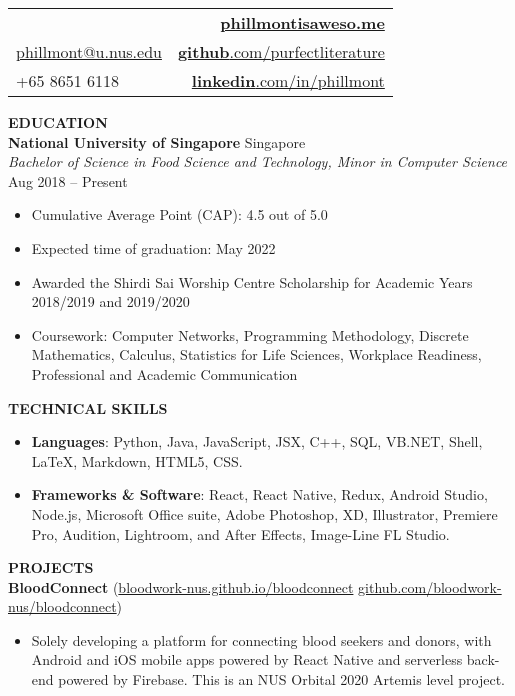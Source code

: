 \documentclass[a4paper, 11pt]{article}
\makeatletter
\newcommand{\interspace}{\vspace{7pt}}
\newcommand{\name}{Phillmont Muktar}
\newcommand{\cname}{\begin{CJK*}{UTF8}{zhsong}郑传期\end{CJK*}}
\newcommand{\tel}{+65 8651 6118}
\newcommand{\email}{\href{mailto:phillmont@u.nus.edu}{phillmont@u.nus.edu}}
\newcommand{\linkedin}{\href{http://linkedin.com/in/phillmont}{\textbf{linkedin}.com/in/phillmont}}
\newcommand{\github}{\href{http://github.com/purfectliterature}{\textbf{github}.com/purfectliterature}}
\newcommand{\mysite}{\href{https://phillmontisaweso.me}{\textbf{phillmontisaweso.me}}}
\makeatother
\begin{document}
	\sffamily
	
	\begin{tabularx}{\linewidth}{@{}X r@{}}
		{\Large \textbf{\name, \cname}} & \mysite\\ 
		\email & \github\\
		\tel & \linkedin
	\end{tabularx}

	\interspace

	\textbf{\large EDUCATION} \hrulefill \\
	\textbf{National University of Singapore} \hfill Singapore\\
	\textit{Bachelor of Science in Food Science and Technology, Minor in Computer Science} \hfill Aug 2018 -- Present
	\begin{itemize}[leftmargin=*, noitemsep, topsep=0pt]
		\item Cumulative Average Point (CAP): 4.5 out of 5.0
		\item Expected time of graduation: May 2022
		\item Awarded the Shirdi Sai Worship Centre Scholarship for Academic Years 2018/2019 and 2019/2020
		\item Coursework: Computer Networks, Programming Methodology, Discrete Mathematics, Calculus, Statistics for Life Sciences, Workplace Readiness, Professional and Academic Communication
	\end{itemize}
	
	\interspace
	
	\textbf{\large TECHNICAL SKILLS} \hrulefill
	\begin{itemize}[leftmargin=*, noitemsep, topsep=0pt]
		\item \textbf{Languages}: Python, Java, JavaScript, JSX, C++, SQL, VB.NET, Shell, \LaTeX, Markdown, HTML5, CSS.
		\item \textbf{Frameworks \& Software}: React, React Native, Redux, Android Studio, Node.js, Microsoft Office suite, Adobe Photoshop, XD, Illustrator, Premiere Pro, Audition, Lightroom, and After Effects, Image-Line FL Studio.
	\end{itemize}

	\interspace
	
	\textbf{\large PROJECTS} \hrulefill \\
	\textbf{BloodConnect} (\href{https://bloodwork-nus.github.io/bloodconnect/}{bloodwork-nus.github.io/bloodconnect} \textbar\space \href{https://github.com/bloodwork-nus/bloodconnect}{github.com/bloodwork-nus/bloodconnect})
	\begin{itemize}[leftmargin=*, noitemsep, topsep=0pt]
		\item Solely developing a platform for connecting blood seekers and donors, with Android and iOS mobile apps powered by React Native and serverless back-end powered by Firebase. This is an NUS Orbital 2020 Artemis level project.
	\end{itemize}
	
\end{document}
